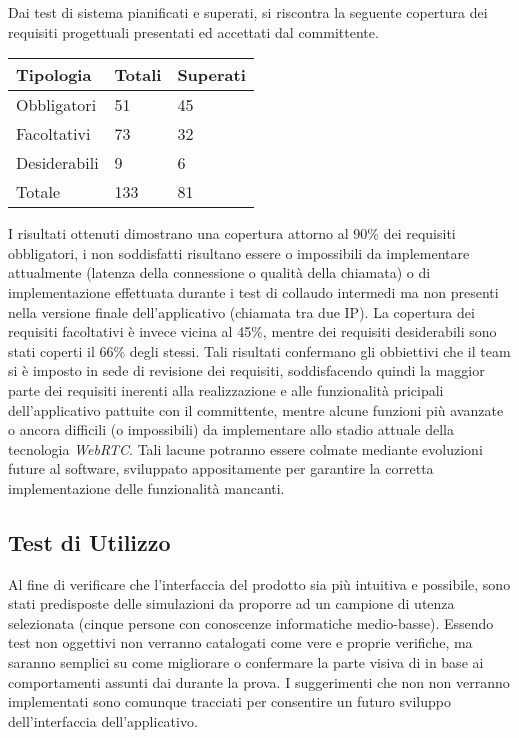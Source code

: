 Dai test di sistema pianificati e superati, si riscontra la seguente copertura dei requisiti progettuali presentati ed accettati dal committente.

\begin{center}
\begin{longtable}{p{}ll}
\toprule Tipologia & Totali  & Superati\\
\midrule

Obbligatori & 51 & 45\\
Facoltativi & 73 & 32\\
Desiderabili & 9 & 6\\
\bottomrule
Totale &133 & 81\\
\end{longtable}
\end{center}

I risultati ottenuti dimostrano una copertura attorno al 90\% dei requisiti obbligatori, i non soddisfatti risultano essere o impossibili da implementare attualmente (latenza della connessione o qualità della chiamata) o di implementazione effettuata durante i test di collaudo intermedi ma non presenti nella versione finale dell'applicativo (chiamata tra due IP).
La copertura dei requisiti facoltativi è invece vicina al 45\%, mentre dei requisiti desiderabili sono stati coperti il 66\% degli stessi.
Tali risultati confermano gli obbiettivi che il team si è imposto in sede di revisione dei requisiti, soddisfacendo quindi la maggior parte dei requisiti inerenti alla realizzazione e alle funzionalità pricipali dell'applicativo pattuite con il committente, mentre alcune funzioni più avanzate o ancora difficili (o impossibili) da implementare allo stadio attuale della tecnologia \textit{WebRTC}. Tali lacune potranno essere colmate mediante evoluzioni future al software, sviluppato appositamente per garantire la corretta implementazione delle funzionalità mancanti.

\clearpage
\subsection{Test di Utilizzo}
Al fine di verificare che l'interfaccia del prodotto sia più intuitiva e  possibile, sono stati predisposte delle simulazioni da proporre ad un campione di utenza selezionata (cinque persone con conoscenze informatiche medio-basse).
Essendo test non oggettivi non verranno catalogati come vere e proprie verifiche, ma saranno semplici  su come migliorare o confermare la parte visiva di \caName in base ai comportamenti assunti dai  durante la prova.
I suggerimenti che non non verranno implementati sono comunque tracciati per consentire un futuro sviluppo dell'interfaccia dell'applicativo.

